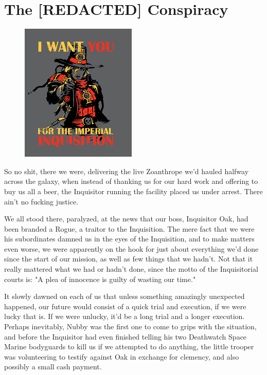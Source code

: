 \chapter{The [REDACTED] Conspiracy}

\begin{figure}
	\begin{center}
		\includegraphics[width=\figwidth]{pics/16/1.png}
	\end{center}
\end{figure}
So no shit, there we were, delivering the live Zoanthrope we'd hauled halfway across the galaxy, when instead of thanking us for our hard work and offering to buy us all a beer, the Inquisitor running the facility placed us under arrest. 
There ain't no fucking justice.

We all stood there, paralyzed, at the news that our boss, Inquisitor Oak, had been branded a Rogue, a traitor to the Inquisition. 
The mere fact that we were his subordinates damned us in the eyes of the Inquisition, and to make matters even worse, we were apparently on the hook for just about everything we'd done since the start of our mission, as well as few things that we hadn't. 
Not that it really mattered what we had or hadn't done, since the motto of the Inquisitorial courts is: 
"A plea of innocence is guilty of wasting our time."

It slowly dawned on each of us that unless something amazingly unexpected happened, our future would consist of a quick trial and execution, if we were lucky that is. 
If we were unlucky, it'd be a long trial and a longer execution. 
Perhaps inevitably, Nubby was the first one to come to grips with the situation, and before the Inquisitor had even finished telling his two Deathwatch Space Marine bodyguards to kill us if we attempted to do anything, the little trooper was volunteering to testify against Oak in exchange for clemency, and also possibly a small cash payment. 


